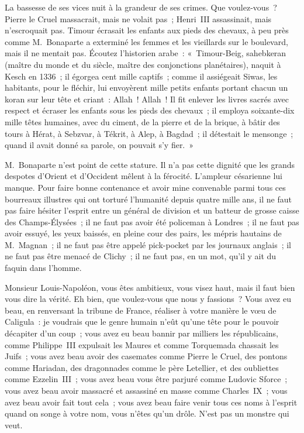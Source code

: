 \documentclass[french,twoside]{book} %
\begin{document}
La bassesse de ses vices nuit à la grandeur de ses crimes. Que voulez-vous ? Pierre le Cruel massacrait, mais ne volait pas ; Henri III assassinait, mais n’escroquait pas. Timour écrasait les enfants aux pieds des chevaux, à peu près comme M. Bonaparte a exterminé les femmes et les vieillards sur le boulevard, mais il ne mentait pas. Écoutez l’historien arabe : « Timour-Beig, sahebkeran (maître du monde et du siècle, maître des conjonctions planétaires), naquit à Kesch en 1336 ; il égorgea cent mille captifs ; comme il assiégeait Siwas, les habitants, pour le fléchir, lui envoyèrent mille petits enfants portant chacun un koran sur leur tête et criant : Allah ! Allah ! Il fit enlever les livres sacrés avec respect et écraser les enfants sous les pieds des chevaux ; il employa soixante-dix mille têtes humaines, avec du ciment, de la pierre et de la brique, à bâtir des tours à Hérat, à Sebzvar, à Tékrit, à Alep, à Bagdad ; il détestait le mensonge ; quand il avait donné sa parole, on pouvait s’y fier. »\par
M. Bonaparte n’est point de cette stature. Il n’a pas cette dignité que les grands despotes d’Orient et d’Occident mêlent à la férocité. L’ampleur césarienne lui manque. Pour faire bonne contenance et avoir mine convenable parmi tous ces bourreaux illustres qui ont torturé l’humanité depuis quatre mille ans, il ne faut pas faire hésiter l’esprit entre un général de division et un batteur de grosse caisse des Champs-Élysées ; il ne faut pas avoir été policeman à Londres ; il ne faut pas avoir essuyé, les yeux baissés, en pleine cour des pairs, les mépris hautains de M. Magnan ; il ne faut pas être appelé pick-pocket par les journaux anglais ; il ne faut pas être menacé de Clichy ; il ne faut pas, en un mot, qu’il y ait du faquin dans l’homme.\par
Monsieur Louis-Napoléon, vous êtes ambitieux, vous visez haut, mais il faut bien vous dire la vérité. Eh bien, que voulez-vous que nous y fassions ? Vous avez eu beau, en renversant la tribune de France, réaliser à votre manière le vœu de Caligula : je voudrais que le genre humain n’eût qu’une tête pour le pouvoir décapiter d’un coup ; vous avez eu beau bannir par milliers les républicains, comme Philippe III expulsait les Maures et comme Torquemada chassait les Juifs ; vous avez beau avoir des casemates comme Pierre le Cruel, des pontons comme Hariadan, des dragonnades comme le père Letellier, et des oubliettes comme Ezzelin III ; vous avez beau vous être parjuré comme Ludovic Sforce ; vous avez beau avoir massacré et assassiné en masse comme Charles IX ; vous avez beau avoir fait tout cela ; vous avez beau faire venir tous ces noms à l’esprit quand on songe à votre nom, vous n’êtes qu’un drôle. N’est pas un monstre qui veut.\par
\end{document}
